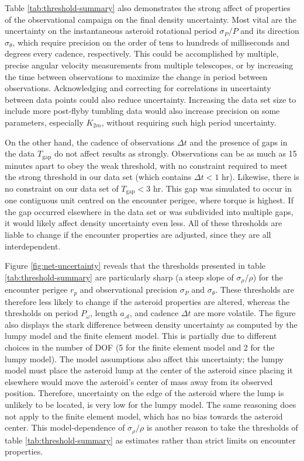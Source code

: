\documentclass[fleqn,usenatbib]{mnras}
\begin{document}
Table \ref{tab:threshold-summary} also demonstrates the strong affect of properties of the observational campaign on the final density uncertainty. Most vital are the uncertainty on the instantaneous asteroid rotational period $\sigma_P / P$ and its direction $\sigma_\theta$, which require precision on the order of tens to hundreds of milliseconds and degrees every cadence, respectively. This could be accomplished by multiple, precise angular velocity measurements from multiple telescopes, or by increasing the time between observations to maximize the change in period between observations. Acknowledging and correcting for correlations in uncertainty between data points could also reduce uncertainty. Increasing the data set size to include more post-flyby tumbling data would also increase precision on some parameters, especially $K_{2m}$, without requiring such high period uncertainty.

On the other hand, the cadence of observations $\Delta t$ and the presence of gaps in the data $T_\text{gap}$ do not affect results as strongly. Observations can be as much as 15 minutes apart to obey the weak threshold, with no constraint required to meet the strong threshold in our data set (which contains $\Delta t < 1$ hr). Likewise, there is no constraint on our data set of $T_\text{gap} < 3$ hr. This gap was simulated to occur in one contiguous unit centred on the encounter perigee, where torque is highest. If the gap occurred elsewhere in the data set or was subdivided into multiple gaps, it would likely affect density uncertainty even less. All of these thresholds are liable to change if the encounter properties are adjusted, since they are all interdependent.

Figure \ref{fig:net-uncertainty} reveals that the thresholds presented in table \ref{tab:threshold-summary} are particularly sharp (a steep slope of $\sigma_\rho / \rho$) for the encounter perigee $r_p$ and observational precision $\sigma_P$ and $\sigma_\theta$. These thresholds are therefore less likely to change if the asteroid properties are altered, whereas the thresholds on period $P_\omega$, length $a_\mathcal{A}$, and cadence $\Delta t$ are more volatile. The figure also displays the stark difference between density uncertainty as computed by the lumpy model and the finite element model. This is partially due to different choices in the number of DOF (5 for the finite element model and 2 for the lumpy model). The model assumptions also affect this uncertainty; the lumpy model must place the asteroid lump at the center of the asteroid since placing it elsewhere would move the asteroid's center of mass away from its observed position. Therefore, uncertainty on the edge of the asteroid where the lump is unlikely to be located, is very low for the lumpy model. The same reasoning does not apply to the finite element model, which has no bias towards the asteroid center. This model-dependence of $\sigma_\rho / \rho$ is another reason to take the thresholds of table \ref{tab:threshold-summary} as estimates rather than strict limits on encounter properties.
\end{document}

